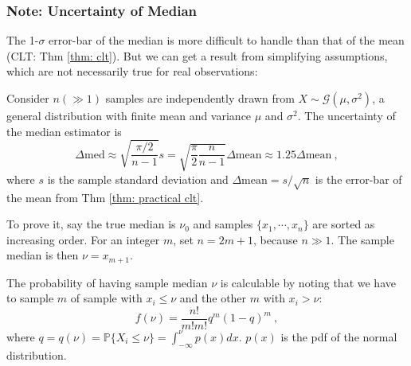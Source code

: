 \subsubsection*{Note: Uncertainty of Median}
The 1-$ \sigma $ error-bar of the median is more difficult to handle than that of the mean (CLT: Thm \ref{thm: clt}). But we can get a result from simplifying assumptions, which are not necessarily true for real observations:

\begin{thm}
  Consider $ n (\gg 1) $ samples are independently drawn from $ X \sim \mathcal{G}(\mu, \sigma^2) $, a general distribution with finite mean and variance $ \mu $ and $ \sigma^2 $. The uncertainty of the median estimator is 
  \begin{equation}\label{eq: err median}
    \Delta \mathrm{med} 
      \approx \sqrt{\frac{\pi / 2}{n - 1}} s 
      = \sqrt{\frac{\pi}{2} \frac{n}{n - 1}} \Delta \mathrm{mean}
      \approx 1.25 \Delta \mathrm{mean}
       ~,
  \end{equation}
  where $ s $ is the sample standard deviation and $ \Delta \mathrm{mean} = s / \sqrt{n} $ is the error-bar of the mean from Thm \ref{thm: practical clt}.
\end{thm}
To prove it, say the true median is $ \nu_0 $ and samples $ \{ x_1, \cdots, x_n \} $ are sorted as increasing order. For an integer $ m $, set $ n = 2m + 1 $, because $ n \gg 1 $. The sample median is then $ \nu = x_{m + 1} $.

The probability of having sample median $ \nu $ is calculable by noting that we have to sample $ m $ of sample with $ x_i \le \nu $ and the other $ m $ with $ x_i > \nu $:
\begin{equation*}
  f(\nu) = \frac{n!}{m! m!} q^m (1 - q)^{m} ~,
\end{equation*}
where $ q = q(\nu) = \mathbb{P} \{ X_i \le \nu \} = \int_{-\infty}^{\nu} p(x) dx $. $ p(x) $ is the pdf of the normal distribution. 

